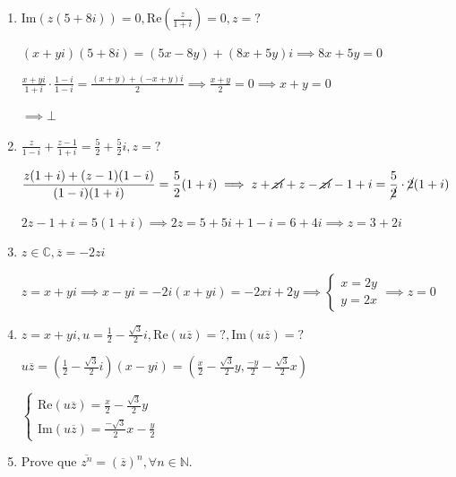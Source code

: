 \documentclass[12pt, openright, a4paper, twoside, english, brazil]{article}
\newenvironment{qitem}{
  \color{black}
\item}{\vspace{10pt}}
\begin{document}
\begin{enumerate}[\bfseries 1.]
  \begin{qitem} %
    $\displaystyle \text{Im}(z(5+8i))=0,\text{Re}(\frac{z}{1+i})=0,z=?$

    \color{red}
    $(x+yi)(5+8i)=(5x-8y)+(8x+5y)i\implies 8x+5y=0$

    $\displaystyle
    \frac{x+yi}{1+i}\cdot\frac{1-i}{1-i}=\frac{(x+y)+(-x+y)i}{2}\implies
    \frac{x+y}{2}=0\implies x+y=0$

    $\implies \bot$
  \end{qitem}

  \begin{qitem} %
    $\displaystyle \frac{z}{1-i}+\frac{z-1}{1+i}=\frac{5}{2}+\frac{5}{2}i, z=?$

    \color{red}
    $\displaystyle
    \frac{z(1+i)+(z-1)(1-i)}{(1-i)(1+i)}=\frac52(1+i)\implies
    z+\cancel{zi}+z-\cancel{zi}-1+i=\frac{5}{\cancel{2}}\cdot \cancel{2}(1+i)$

    $\displaystyle 2z-1+i=5(1+i)\implies 2z=5+5i+1-i=6+4i\implies z=3+2i$
  \end{qitem}

  \begin{qitem} %
    $z\in\mathbb C, \overline z=-2zi$

    \color{red}
    $z=x+yi\implies x-yi=-2i(x+yi)=-2xi+2y\implies
    \begin{cases}x=2y\\y=2x
    \end{cases}\implies z=0$
  \end{qitem}

  \begin{qitem} %
    $\displaystyle z=x+yi,u=\frac12-\frac{\sqrt{3}}{2}i,
    \text{Re}(u\overline z)=?,\text{Im}(u\overline z)=?$

    \color{red}
    $\displaystyle u\overline z=\left(\frac12
    -\frac{\sqrt{3}}{2}i\right)(x-yi)=\left(\frac
    x2-\frac{\sqrt{3}}{2}y,\frac{-y}{2}-\frac{\sqrt{3}}{2}x\right)$

    $
    \begin{cases}
      \displaystyle\text{Re}(u\overline z)=\frac x2-\frac{\sqrt{3}}{2}y\\
      \displaystyle\text{Im}(u\overline z)=\frac{-\sqrt{3}}{2}x-\frac{y}{2}
    \end{cases}$
  \end{qitem}

  \begin{qitem} %
    $\text{Prove que }\overline{z^n}=(\overline{z})^n,\forall n\in\mathbb N$.


\end{qitem}
\end{enumerate}
\end{document}
